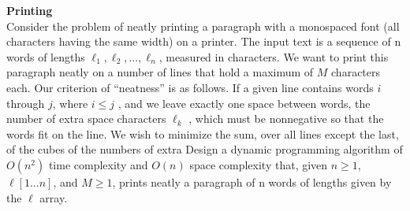 \textbf{Printing} \\
Consider the problem of neatly printing a paragraph with a monospaced font (all characters having the
same width) on a printer. The input text is a sequence of n words of lengths $\ell_1, \ell_2, . . . , \ell_n$, measured
in characters. We want to print this paragraph neatly on a number of lines that hold a maximum of
$M$ characters each. Our criterion of “neatness” is as follows. If a given line contains words $i$ through
$j$, where $i \leq j$ , and we leave exactly one space between words, the number of extra space characters
$\ell_k$ , which must be nonnegative so that the words fit on the
line. We wish to minimize the sum, over all lines except the last, of the cubes of the numbers of extra
Design a dynamic programming algorithm of $O(n^2)$ time complexity and $O(n)$ space complexity that,
given $n \geq 1$, $\ell[1 . . . n]$, and $M \geq 1$, prints neatly a paragraph of n words of lengths given by the $\ell$ array.

